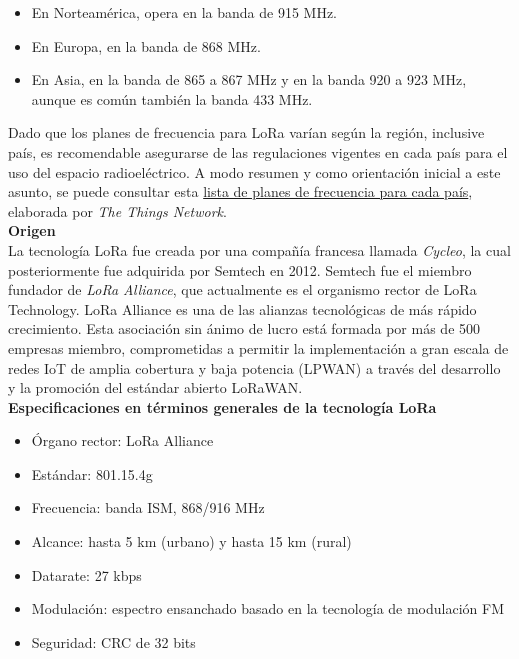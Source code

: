 \documentclass[12pt]{article}
\begin{document}
	\begin{itemize}
		\item En Norteamérica, opera en la banda de 915 MHz.
		\item En Europa, en la banda de 868 MHz.
		\item En Asia, en la banda de 865 a 867 MHz y en la banda 920 a 923 MHz, aunque es común también la banda 433 MHz.
	\end{itemize}
	
	\noindent Dado que los planes de frecuencia para LoRa varían según la región, inclusive país, es recomendable asegurarse de las regulaciones vigentes en cada país para el uso del espacio radioeléctrico. A modo resumen y como orientación inicial a este asunto, se puede consultar esta \href{https://www.thethingsnetwork.org/docs/lorawan/frequencies-by-country/index.html}{lista de planes de frecuencia para cada país}, elaborada por \textit{The Things Network}. \\
	
	\noindent \textbf{Origen} \\
	
	\noindent La tecnología LoRa fue creada por una compañía francesa llamada \textit{Cycleo}, la cual posteriormente fue adquirida por Semtech en 2012. Semtech fue el miembro fundador de \textit{LoRa Alliance}, que actualmente es el organismo rector de LoRa Technology. LoRa Alliance es una de las alianzas tecnológicas de más rápido crecimiento. Esta asociación sin ánimo de lucro está formada por más de 500 empresas miembro, comprometidas a permitir la implementación a gran escala de redes IoT de amplia cobertura y baja potencia (LPWAN) a través del desarrollo y la promoción del estándar abierto LoRaWAN.\\
	
	\noindent \textbf{Especificaciones en términos generales de la tecnología LoRa}
	
	\begin{itemize}
		\item Órgano rector: LoRa Alliance
		\item Estándar: 801.15.4g
		\item Frecuencia: banda ISM, 868/916 MHz
		\item Alcance: hasta 5 km (urbano) y hasta 15 km (rural)
		\item Datarate: 27 kbps
		\item Modulación: espectro ensanchado basado en la tecnología de modulación FM
		\item Seguridad: CRC de 32 bits
	\end{itemize}
	 
\end{document}
